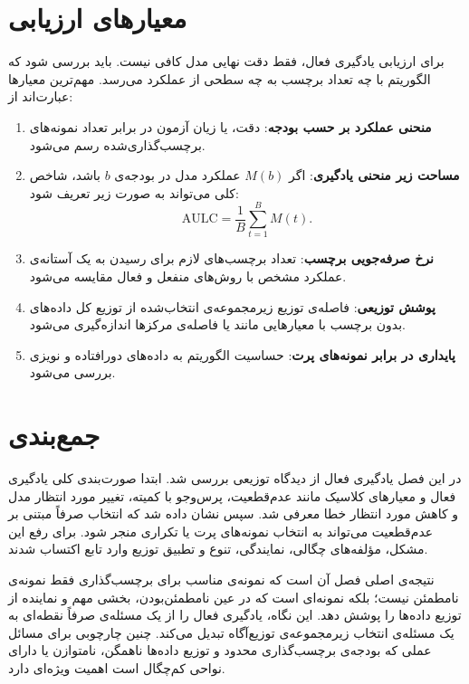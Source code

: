 \documentclass[12pt,a4paper,oneside]{report}
\begin{document}
\section{معیارهای ارزیابی}
\label{sec:dal_evaluation}

برای ارزیابی یادگیری فعال، فقط دقت نهایی مدل کافی نیست. باید بررسی شود که الگوریتم با چه تعداد برچسب به چه سطحی از عملکرد می‌رسد. مهم‌ترین معیارها عبارت‌اند از:
\begin{enumerate}[label=\arabic*)]
\item \textbf{منحنی عملکرد بر حسب بودجه}: دقت،  یا زیان آزمون در برابر تعداد نمونه‌های برچسب‌گذاری‌شده رسم می‌شود.
\item \textbf{مساحت زیر منحنی یادگیری}: اگر $M(b)$ عملکرد مدل در بودجه‌ی $b$ باشد، شاخص کلی می‌تواند به صورت زیر تعریف شود:
\begin{equation}
\mathrm{AULC}=\frac{1}{B}\sum_{t=1}^{B}M(t).
\end{equation}
\item \textbf{نرخ صرفه‌جویی برچسب}: تعداد برچسب‌های لازم برای رسیدن به یک آستانه‌ی عملکرد مشخص با روش‌های منفعل و فعال مقایسه می‌شود.
\item \textbf{پوشش توزیعی}: فاصله‌ی توزیع زیرمجموعه‌ی انتخاب‌شده از توزیع کل داده‌های بدون برچسب با معیارهایی مانند  یا فاصله‌ی مرکزها اندازه‌گیری می‌شود.
\item \textbf{پایداری در برابر نمونه‌های پرت}: حساسیت الگوریتم به داده‌های دورافتاده و نویزی بررسی می‌شود.
\end{enumerate}

\section{جمع‌بندی}
\label{sec:dal_conclusion}

در این فصل یادگیری فعال از دیدگاه توزیعی بررسی شد. ابتدا صورت‌بندی کلی یادگیری فعال و معیارهای کلاسیک مانند عدم‌قطعیت، پرس‌وجو با کمیته، تغییر مورد انتظار مدل و کاهش مورد انتظار خطا معرفی شد. سپس نشان داده شد که انتخاب صرفاً مبتنی بر عدم‌قطعیت می‌تواند به انتخاب نمونه‌های پرت یا تکراری منجر شود. برای رفع این مشکل، مؤلفه‌های چگالی، نمایندگی، تنوع و تطبیق توزیع وارد تابع اکتساب شدند.

نتیجه‌ی اصلی فصل آن است که نمونه‌ی مناسب برای برچسب‌گذاری فقط نمونه‌ی نامطمئن نیست؛ بلکه نمونه‌ای است که در عین نامطمئن‌بودن، بخشی مهم و نماینده از توزیع داده‌ها را پوشش دهد. این نگاه، یادگیری فعال را از یک مسئله‌ی صرفاً نقطه‌ای به یک مسئله‌ی انتخاب زیرمجموعه‌ی توزیع‌آگاه تبدیل می‌کند. چنین چارچوبی برای مسائل عملی که بودجه‌ی برچسب‌گذاری محدود و توزیع داده‌ها ناهمگن، نامتوازن یا دارای نواحی کم‌چگال است اهمیت ویژه‌ای دارد.
\end{document}
